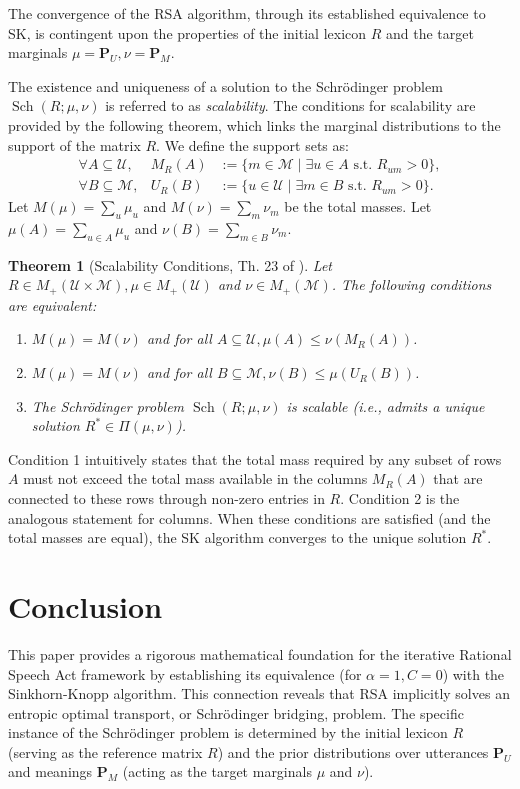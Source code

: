 \documentclass{article}
\newtheorem{theorem}{Theorem}[section] %
\begin{document}
The convergence of the RSA algorithm, through its established equivalence to SK, is contingent upon the properties of the initial lexicon $R$ and the target marginals $\mu=\mathbf{P}_U, \nu=\mathbf{P}_M$.

The existence and uniqueness of a solution to the Schrödinger problem $\operatorname{Sch}(R ; \mu, \nu)$ is referred to as \textit{scalability}. The conditions for scalability are provided by the following theorem, which links the marginal distributions to the support of the matrix $R$. We define the support sets as:
\[
\begin{array}{rcl}
\forall A \subseteq \mathcal{U}, & M_R(A) &:=\{m \in \mathcal{M} \mid \exists u \in A \text { s.t. } R_{um}>0\}, \\
\forall B \subseteq \mathcal{M}, & U_R(B) &:=\{u \in \mathcal{U} \mid \exists m \in B \text { s.t. } R_{um}>0\} .
\end{array}
\]
Let $M(\mu) = \sum_u \mu_u$ and $M(\nu) = \sum_m \nu_m$ be the total masses. Let $\mu(A) = \sum_{u \in A} \mu_u$ and $\nu(B) = \sum_{m \in B} \nu_m$.

\begin{theorem}[Scalability Conditions, Th. 23 of \cite{baradat2023convergencesinkhornalgorithmschrodinger}]\label{th:scalable}
Let $R \in M_{+}(\mathcal{U} \times \mathcal{M}), \mu \in M_{+}(\mathcal{U})$ and $\nu \in M_{+}(\mathcal{M})$. The following conditions are equivalent:
\begin{enumerate}
\item $M(\mu)=M(\nu)$ and for all $A \subseteq \mathcal{U}, \mu(A) \leq \nu\left(M_R(A)\right)$.
\item $M(\mu)=M(\nu)$ and for all $B \subseteq \mathcal{M}, \nu(B) \leq \mu\left(U_R(B)\right)$.
\item The Schrödinger problem $\operatorname{Sch}(R ; \mu, \nu)$ is scalable (i.e., admits a unique solution $R^* \in \Pi(\mu, \nu)$).
\end{enumerate}
\end{theorem}
Condition 1 intuitively states that the total mass required by any subset of rows $A$ must not exceed the total mass available in the columns $M_R(A)$ that are connected to these rows through non-zero entries in $R$. Condition 2 is the analogous statement for columns. When these conditions are satisfied (and the total masses are equal), the SK algorithm converges to the unique solution $R^*$.



\section{Conclusion}
This paper provides a rigorous mathematical foundation for the iterative Rational Speech Act framework by establishing its equivalence (for $\alpha=1, C=0$) with the Sinkhorn-Knopp algorithm. This connection reveals that RSA implicitly solves an entropic optimal transport, or Schrödinger bridging, problem. The specific instance of the Schrödinger problem is determined by the initial lexicon $R$ (serving as the reference matrix $R$) and the prior distributions over utterances $\mathbf{P}_U$ and meanings $\mathbf{P}_M$ (acting as the target marginals $\mu$ and $\nu$).
\end{document}
